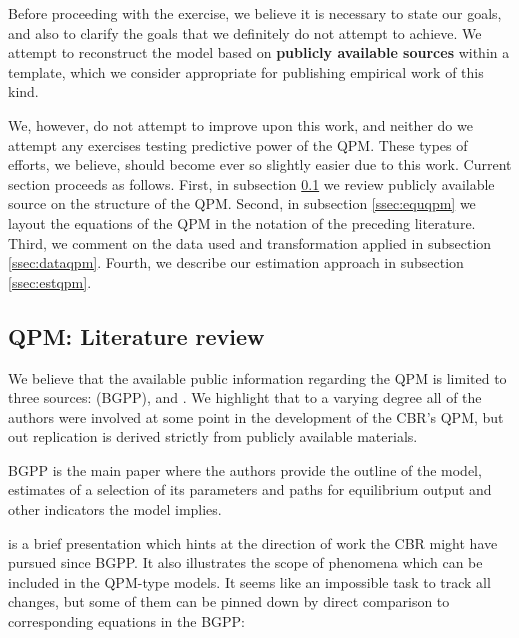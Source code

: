 \documentclass[12pt]{article}
\begin{document}
Before proceeding with the exercise, we believe it is necessary to state our goals, and also to clarify the goals that we definitely do not attempt to achieve. We attempt to reconstruct the model based on {\bf publicly available sources} within a template, which we consider appropriate for publishing empirical work of this kind. 

We, however, do not attempt to improve upon this work, and neither do we attempt any exercises testing predictive power of the QPM. These types of efforts, we believe, should become ever so slightly easier due to this work. Current section proceeds as follows. First, in subsection \ref{ssec:pusoqpm} we review publicly available source on the structure of the QPM. Second, in subsection \ref{ssec:equqpm} we layout the equations of the QPM in the notation of the preceding literature. Third, we comment on the data used and transformation applied in subsection \ref{ssec:dataqpm}. Fourth, we describe our estimation approach in subsection \ref{ssec:estqpm}.

\subsection{QPM: Literature review}
\label{ssec:pusoqpm}

We believe that the available public information regarding the QPM is limited to three sources: \cite{bgpp2008} (BGPP), \cite{borodin2014} and \cite{bankofrussiampr201501}. We highlight that to a varying degree all of the authors were involved at some point in the development of the CBR's QPM, but out replication is derived strictly from publicly available materials.

BGPP is the main paper where the authors provide the outline of the model, estimates of a selection of its parameters and paths for equilibrium output and other indicators the model implies.

\cite{borodin2014} is a brief presentation which hints at the direction of work the CBR might have pursued since BGPP. It also illustrates the scope of phenomena which can be included in the QPM-type models. It seems like an impossible task to track all changes, but some of them can be pinned down by direct comparison to corresponding equations in the BGPP:
\end{document}
